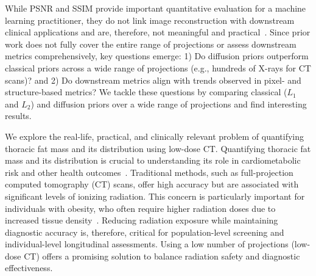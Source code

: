 While PSNR and SSIM provide important quantitative evaluation for a machine learning practitioner, they do not link image reconstruction with downstream clinical applications and are, therefore, not meaningful and practical~\cite{cheung2024metric}.
Since prior work does not fully cover the entire range of projections or assess downstream metrics comprehensively, key questions emerge: 1) Do diffusion priors outperform classical priors across a wide range of projections (e.g., hundreds of X-rays for CT scans)? and 2) Do downstream metrics align with trends observed in pixel- and structure-based metrics?
We tackle these questions by comparing classical ($L_1$ and $L_2$) and diffusion priors over a wide range of projections and find interesting results.

We explore the real-life, practical, and clinically relevant problem of quantifying thoracic fat mass and its distribution using low-dose CT. Quantifying thoracic fat mass and its distribution is crucial to understanding its role in cardiometabolic risk and other health outcomes~\cite{wang2014imaging,dey2012epicardial}.
Traditional methods, such as full-projection computed tomography (CT) scans, offer high accuracy but are associated with significant levels of ionizing radiation. 
This concern is particularly important for individuals with obesity, who often require higher radiation doses due to increased tissue density~\cite{yanch2009increased}. 
Reducing radiation exposure while maintaining diagnostic accuracy is, therefore, critical for population-level screening and individual-level longitudinal assessments.
Using a low number of projections (low-dose CT) offers a promising solution to balance radiation safety and diagnostic effectiveness. 


